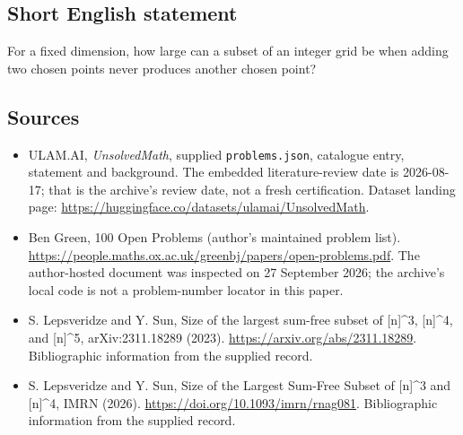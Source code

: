 \documentclass[11pt,a4paper]{article}
\begin{document}
\subsection{Short English statement}

For a fixed dimension, how large can a subset of an integer grid be when adding two chosen points never produces another chosen point?

\subsection{Sources}

{\small

\begin{itemize}

\item[\hypertarget{source:statement:1}{S1}] ULAM.AI, \emph{UnsolvedMath}, supplied \texttt{problems.json}, catalogue entry, statement and background. The embedded literature-review date is 2026-08-17; that is the archive’s review date, not a fresh certification. Dataset landing page: \url{https://huggingface.co/datasets/ulamai/UnsolvedMath}.

\item[\hypertarget{source:statement:2}{S2}] Ben Green, 100 Open Problems (author’s maintained problem list). \url{https://people.maths.ox.ac.uk/greenbj/papers/open-problems.pdf}. The author-hosted document was inspected on 27 September 2026; the archive’s local code is not a problem-number locator in this paper.

\item[\hypertarget{source:statement:3}{S3}] S. Lepsveridze and Y. Sun, Size of the largest sum-free subset of [n]\textasciicircum{}3, [n]\textasciicircum{}4, and [n]\textasciicircum{}5, arXiv:2311.18289 (2023). \url{https://arxiv.org/abs/2311.18289}. Bibliographic information from the supplied record.

\item[\hypertarget{source:statement:4}{S4}] S. Lepsveridze and Y. Sun, Size of the Largest Sum-Free Subset of [n]\textasciicircum{}3 and [n]\textasciicircum{}4, IMRN (2026). \url{https://doi.org/10.1093/imrn/rnag081}. Bibliographic information from the supplied record.

\end{itemize}

}

\label{end:statement}
\end{document}
